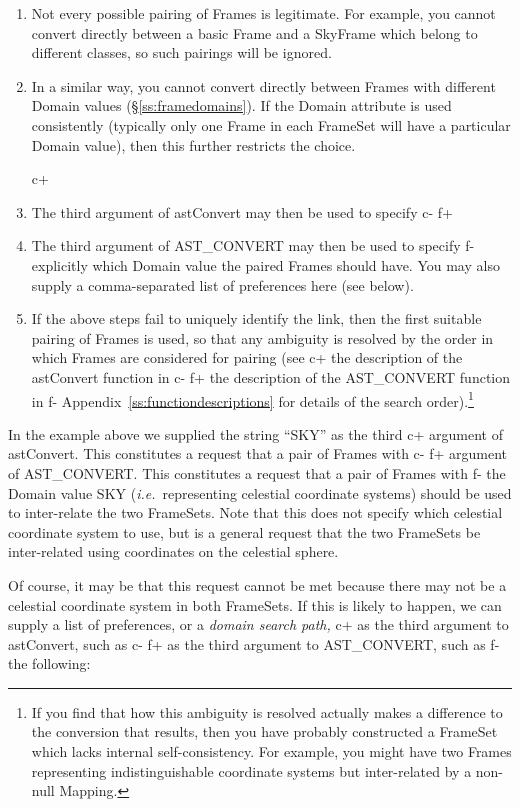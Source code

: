 \documentclass[twoside,11pt]{article}
\newcommand{\appref}[1]{Appendix~\ref{#1}}
\newcommand{\secref}[1]{\S\ref{#1}}
\newcommand{\appref}[1]{\ref{#1}}
\newcommand{\secref}[1]{\ref{#1}}
\begin{document}
\begin{enumerate}
\item Not every possible pairing of Frames is legitimate. For example,
you cannot convert directly between a basic Frame and a SkyFrame which
belong to different classes, so such pairings will be ignored.

\item In a similar way, you cannot convert directly between Frames
with different Domain values (\secref{ss:framedomains}). If the Domain
attribute is used consistently (typically only one Frame in each
FrameSet will have a particular Domain value), then this further
restricts the choice.

c+
\item The third argument of astConvert may then be used to specify
c-
f+
\item The third argument of AST\_CONVERT may then be used to specify
f-
explicitly which Domain value the paired Frames should have. You may
also supply a comma-separated list of preferences here (see below).

\item If the above steps fail to uniquely identify the link, then the
first suitable pairing of Frames is used, so that any ambiguity is
resolved by the order in which Frames are considered for pairing (see
c+
the description of the astConvert function in
c-
f+
the description of the AST\_CONVERT function in
f-
\appref{ss:functiondescriptions} for details of the search
order).\footnote{If you find that how this ambiguity is resolved
actually makes a difference to the conversion that results, then you
have probably constructed a FrameSet which lacks internal
self-consistency. For example, you might have two Frames representing
indistinguishable coordinate systems but inter-related by a non-null
Mapping.}
\end{enumerate}

In the example above we supplied the string ``SKY'' as the third
c+
argument of astConvert. This constitutes a request that a pair of
Frames with
c-
f+
argument of AST\_CONVERT. This constitutes a request that a pair of
Frames with
f-
the Domain value SKY ({\em{i.e.}}\ representing celestial coordinate
systems) should be used to inter-relate the two FrameSets. Note that
this does not specify which celestial coordinate system to use, but is
a general request that the two FrameSets be inter-related using
coordinates on the celestial sphere.

Of course, it may be that this request cannot be met because there may
not be a celestial coordinate system in both FrameSets. If this is
likely to happen, we can supply a list of preferences, or a
{\em{domain search path,}}
c+
as the third argument to astConvert, such as
c-
f+
as the third argument to AST\_CONVERT, such as
f-
the following:
\end{document}
